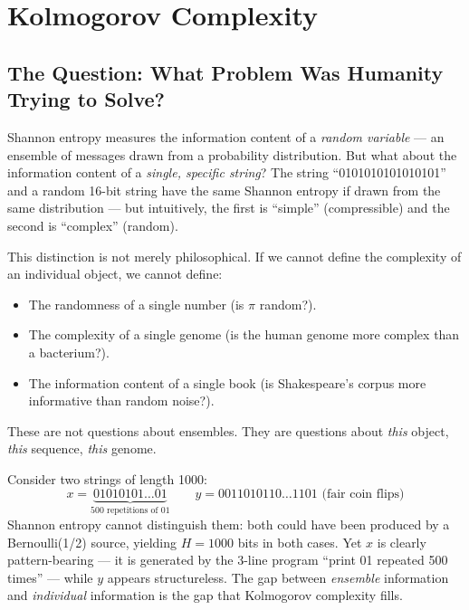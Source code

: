 
\chapter{Kolmogorov Complexity}
\label{ch:kolmogorov}

\section{The Question: What Problem Was Humanity Trying to Solve?}
\label{sec:kolmogorov:question}

Shannon entropy measures the information content of a \emph{random variable} --- an ensemble of messages drawn from a probability distribution. But what about the information content of a \emph{single, specific string}? The string ``0101010101010101'' and a random 16-bit string have the same Shannon entropy if drawn from the same distribution --- but intuitively, the first is ``simple'' (compressible) and the second is ``complex'' (random).

This distinction is not merely philosophical. If we cannot define the complexity of an individual object, we cannot define:
\begin{itemize}
\item The randomness of a single number (is $\pi$ random?).
\item The complexity of a single genome (is the human genome more complex than a bacterium?).
\item The information content of a single book (is Shakespeare's corpus more informative than random noise?).
\end{itemize}
These are not questions about ensembles. They are questions about \emph{this} object, \emph{this} sequence, \emph{this} genome.

Consider two strings of length 1000:
\[
x = \underbrace{01010101\ldots01}_{500\text{ repetitions of }01}
\qquad
y = 0011010110\ldots1101 \text{ (fair coin flips)}
\]
Shannon entropy cannot distinguish them: both could have been produced by a Bernoulli(1/2) source, yielding $H = 1000$ bits in both cases. Yet $x$ is clearly pattern-bearing --- it is generated by the 3-line program ``print 01 repeated 500 times'' --- while $y$ appears structureless. The gap between \emph{ensemble} information and \emph{individual} information is the gap that Kolmogorov complexity fills.

